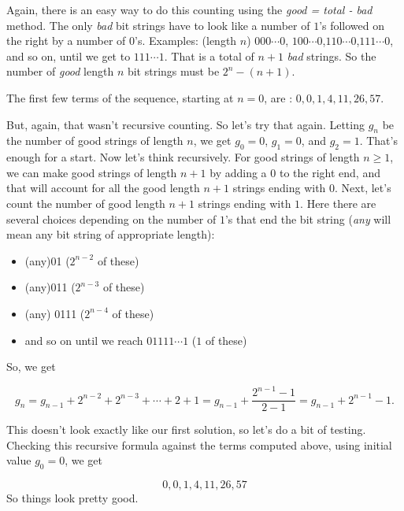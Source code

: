 \begin{Solution}{34.5}

Again, there is an easy way to do this counting using the {\it good = total - bad} method. The only {\it bad} bit strings
have to look like a number of $1$'s followed on the right by a number of $0$'s. Examples: (length $n$)
$000\cdots0$, $100\cdots0$,$110\cdots0$,$111\cdots0$, and so on, until we get to $111\cdots1$. That is a total of $n+1$ {\it bad} strings. So the number of {\it good} length $n$ bit strings must be $2^n - (n+1)$.

The first few terms of the sequence, starting at $n = 0$, are : $0, 0, 1, 4, 11, 26, 57$.

But, again, that wasn't recursive counting. So let's try that again. Letting $g_n$ be the number of good strings of length $n$, we get $g_0 = 0$,  $g_1 = 0$, and $g_2 = 1$. That's enough for a start. Now let's think recursively.
For good strings of length $n\geq 1$, we can make good strings of length $n+1$ by adding a $0$ to the right end,
and that will account for all the good length $n+1$ strings ending with $0$. Next, let's count the number of good length $n+1$ strings ending with $1$. Here there are several choices depending on the number of $1$'s that end the bit string ({\it any} will mean any bit string of appropriate length):

\begin{itemize}
\item (any)01  ($2^{n-2}$ of these)
\item (any)011 ($2^{n-3}$ of these)
\item (any) 0111 ($2^{n-4}$ of these)
\item and so on until we reach $01111\cdots 1$ ($1$ of these)
\end{itemize}

So, we get

\[
g_n =  g_{n-1} + 2^{n-2} + 2^{n-3} + \cdots + 2 + 1 = g_{n-1} + \frac{2^{n-1}-1}{2-1} = g_{n-1} + 2^{n-1}-1.
\]

This doesn't look exactly like our first solution, so let's do a bit of testing. Checking this recursive formula  against the terms computed above, using initial value $g_{0} = 0$, we get

\[
0, 0, 1, 4, 11, 26, 57
\]
So things look pretty good.

\end{Solution}


